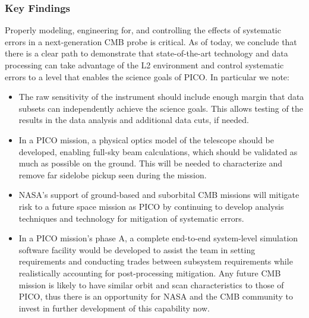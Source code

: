 \documentclass[PICOReport.tex]{subfiles}
\begin{document}
\subsubsection{Key Findings}
Properly modeling, engineering for, and controlling the effects of systematic errors in a
next-generation CMB probe is critical.  As of today, we conclude that there is a clear path to demonstrate that state-of-the-art technology and data processing can take advantage of the L2 environment and control systematic errors to a level that enables the science goals of PICO. In particular we note:
\begin{itemize}
\item The raw sensitivity of the instrument should include enough margin
that data subsets can independently achieve the science goals.
This allows testing of the results in the data analysis and additional
data cuts, if needed.
\item In a PICO mission, a physical optics model of the telescope should be developed, enabling full-sky beam calculations, which should be validated as much as possible on the ground.  This will be needed to characterize and remove far sidelobe pickup seen during the mission. 
\item NASA's support of ground-based and suborbital CMB missions will mitigate risk to a future space mission as PICO by continuing to develop analysis techniques and technology for mitigation of systematic errors.

\item In a PICO mission's phase A, a complete end-to-end system-level
simulation software facility would be developed to assist the team in setting 
requirements and conducting trades between subsystem requirements while
realistically accounting for post-processing mitigation.  Any future
CMB mission is likely to have similar orbit  
and scan characteristics to those of PICO, thus there is an opportunity for NASA and
the CMB community to invest in further development of this capability now.
\end{itemize}
\end{document}
